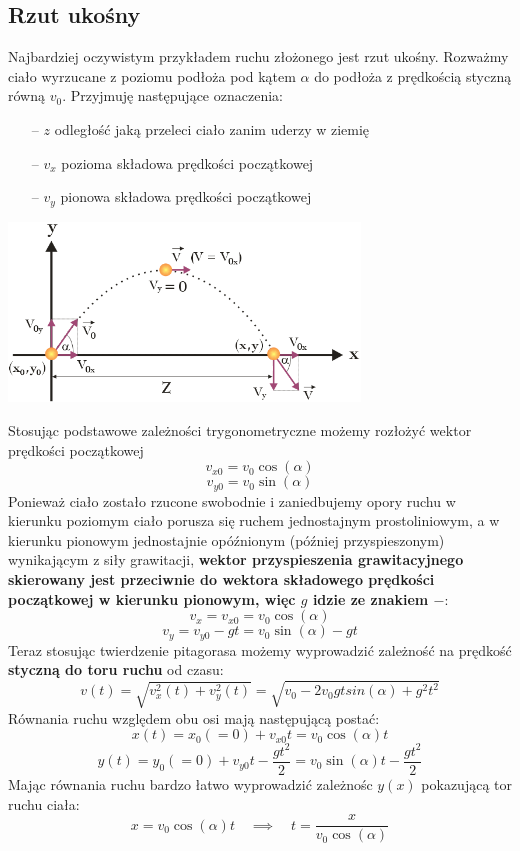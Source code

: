 \documentclass[a4paper]{article}
\begin{document}
    \subsection*{\Large Rzut ukośny}
    Najbardziej oczywistym przykładem ruchu złożonego jest rzut ukośny. 
    Rozważmy ciało wyrzucane z poziomu podłoża pod kątem $\alpha$ do podłoża z prędkością styczną 
    równą $v_0$. Przyjmuję następujące oznaczenia:
    \begin{itemize}
        \item[--] $z$ odległość jaką przeleci ciało zanim uderzy w ziemię
        \item[--] $v_x$ pozioma składowa prędkości początkowej
        \item[--] $v_y$ pionowa składowa prędkości początkowej
    \end{itemize}
    \begin{center}
        \includegraphics[width=0.7\textwidth]{img/rzut_ukosny.png}
    \end{center}
    Stosując podstawowe zależności trygonometryczne możemy rozłożyć wektor prędkości początkowej
    \[v_{x0} = v_0\cos(\alpha)\]
    \[v_{y0} = v_0\sin(\alpha)\]
    Ponieważ ciało zostało rzucone swobodnie i zaniedbujemy opory ruchu w kierunku poziomym ciało 
    porusza się ruchem jednostajnym prostoliniowym, a w kierunku pionowym jednostajnie opóźnionym 
    (później przyspieszonym) wynikającym z siły grawitacji, \textbf{wektor przyspieszenia grawitacyjnego 
    skierowany jest przeciwnie do wektora składowego prędkości początkowej w kierunku pionowym, więc 
    $g$ idzie ze znakiem $-$}:
    \[v_x = v_{x0} = v_0\cos(\alpha)\]
    \[v_y = v_{y0} - gt = v_0\sin(\alpha) - gt\]
    Teraz stosując twierdzenie pitagorasa możemy wyprowadzić zależność na prędkość \textbf{styczną do toru ruchu} od czasu:
    \[v(t) = \sqrt{v_x^2(t) + v_y^2(t)} = \sqrt{v_0 - 2v_0gtsin(\alpha) + g^2t^2}\]
    Równania ruchu względem obu osi mają następującą postać:
    \[x(t) = x_0(=0) + v_{x0}t = v_0\cos(\alpha)t\]
    \[y(t) = y_0(=0) + v_{y0}t - \frac{gt^2}{2} = v_0\sin(\alpha)t - \frac{gt^2}{2}\]
    Mając równania ruchu bardzo łatwo wyprowadzić zależnośc $y(x)$ pokazującą tor ruchu ciała:
    \[x = v_0\cos(\alpha)t \quad\implies\quad t = \frac{x}{v_0\cos(\alpha)}\]
    
\end{document}
